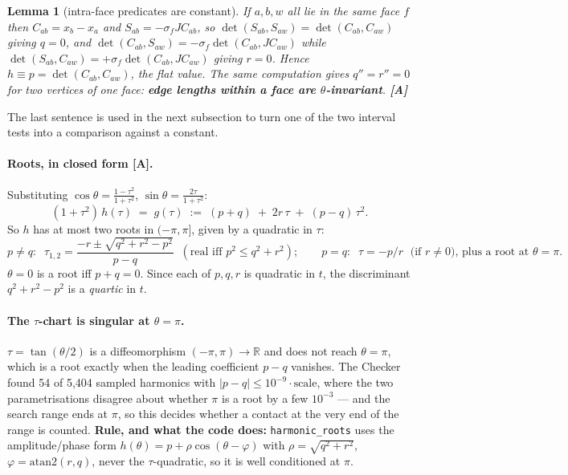 \documentclass[11pt,a4paper]{article}
\newtheorem{lemma}[theorem]{Lemma}
\theoremstyle{definition}
\newcommand{\file}[1]{\texttt{\small #1}}
\begin{document}
\begin{lemma}[intra-face predicates are constant]
If $a,b,w$ all lie in the same face $f$ then $C_{ab}=x_b-x_a$ and
$S_{ab}=-\sigma_fJC_{ab}$, so $\det(S_{ab},S_{aw})=\det(C_{ab},C_{aw})$ giving $q=0$, and
$\det(C_{ab},S_{aw})=-\sigma_f\det(C_{ab},JC_{aw})$ while
$\det(S_{ab},C_{aw})=+\sigma_f\det(C_{ab},JC_{aw})$ giving $r=0$. Hence
$h\equiv p=\det(C_{ab},C_{aw})$, the flat value. The same computation gives $q''=r''=0$ for
two vertices of one face: \textbf{edge lengths within a face are $\theta$-invariant}.
\textbf{[A]}
\end{lemma}
\noindent The last sentence is used in the next subsection to turn one of the two interval
tests into a comparison against a constant.

\paragraph{Roots, in closed form [A].} Substituting
$\cos\theta=\frac{1-\tau^2}{1+\tau^2}$, $\sin\theta=\frac{2\tau}{1+\tau^2}$:
\begin{equation}
(1+\tau^2)\,h(\tau) \;=\; g(\tau) \;:=\; (p+q) \;+\; 2r\,\tau \;+\; (p-q)\,\tau^2 .
\label{eq:gtau}
\end{equation}
So $h$ has at most two roots in $(-\pi,\pi]$, given by a quadratic in $\tau$:
\[
p\ne q:\;\; \tau_{1,2}=\frac{-r\pm\sqrt{q^2+r^2-p^2}}{p-q}\;\;(\text{real iff }p^2\le q^2+r^2);
\qquad
p=q:\;\; \tau=-p/r \;\text{ (if }r\ne0)\text{, plus a root at }\theta=\pi .
\]
$\theta=0$ is a root iff $p+q=0$. Since each of $p,q,r$ is quadratic in $t$, the discriminant
$q^2+r^2-p^2$ is a \emph{quartic} in $t$.

\paragraph{The $\tau$-chart is singular at $\theta=\pi$.} $\tau=\tan(\theta/2)$ is a
diffeomorphism $(-\pi,\pi)\to\mathbb{R}$ and does not reach $\theta=\pi$, which is a root
exactly when the leading coefficient $p-q$ vanishes. The Checker found 54 of 5{,}404 sampled
harmonics with $|p-q|\le10^{-9}\cdot\text{scale}$, where the two parametrisations disagree
about whether $\pi$ is a root by a few $10^{-3}$ --- and the search range ends at $\pi$, so
this decides whether a contact at the very end of the range is counted. \textbf{Rule, and
what the code does:} \file{harmonic\_roots} uses the amplitude/phase form
$h(\theta)=p+\rho\cos(\theta-\varphi)$ with $\rho=\sqrt{q^2+r^2}$, $\varphi=\mathrm{atan2}(r,q)$,
never the $\tau$-quadratic, so it is well conditioned at $\pi$.
\end{document}
